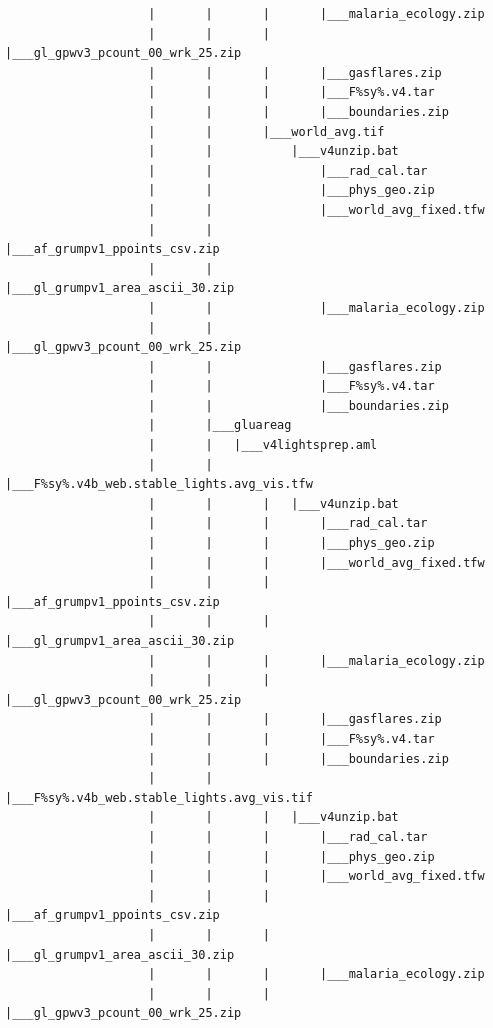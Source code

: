 \documentclass[]{book}
\begin{document}
\begin{verbatim}
                    |       |       |       |___malaria_ecology.zip
                    |       |       |       |___gl_gpwv3_pcount_00_wrk_25.zip
                    |       |       |       |___gasflares.zip
                    |       |       |       |___F%sy%.v4.tar
                    |       |       |       |___boundaries.zip
                    |       |       |___world_avg.tif
                    |       |           |___v4unzip.bat
                    |       |               |___rad_cal.tar
                    |       |               |___phys_geo.zip
                    |       |               |___world_avg_fixed.tfw
                    |       |               |___af_grumpv1_ppoints_csv.zip
                    |       |               |___gl_grumpv1_area_ascii_30.zip
                    |       |               |___malaria_ecology.zip
                    |       |               |___gl_gpwv3_pcount_00_wrk_25.zip
                    |       |               |___gasflares.zip
                    |       |               |___F%sy%.v4.tar
                    |       |               |___boundaries.zip
                    |       |___gluareag
                    |       |   |___v4lightsprep.aml
                    |       |       |___F%sy%.v4b_web.stable_lights.avg_vis.tfw
                    |       |       |   |___v4unzip.bat
                    |       |       |       |___rad_cal.tar
                    |       |       |       |___phys_geo.zip
                    |       |       |       |___world_avg_fixed.tfw
                    |       |       |       |___af_grumpv1_ppoints_csv.zip
                    |       |       |       |___gl_grumpv1_area_ascii_30.zip
                    |       |       |       |___malaria_ecology.zip
                    |       |       |       |___gl_gpwv3_pcount_00_wrk_25.zip
                    |       |       |       |___gasflares.zip
                    |       |       |       |___F%sy%.v4.tar
                    |       |       |       |___boundaries.zip
                    |       |       |___F%sy%.v4b_web.stable_lights.avg_vis.tif
                    |       |       |   |___v4unzip.bat
                    |       |       |       |___rad_cal.tar
                    |       |       |       |___phys_geo.zip
                    |       |       |       |___world_avg_fixed.tfw
                    |       |       |       |___af_grumpv1_ppoints_csv.zip
                    |       |       |       |___gl_grumpv1_area_ascii_30.zip
                    |       |       |       |___malaria_ecology.zip
                    |       |       |       |___gl_gpwv3_pcount_00_wrk_25.zip

\end{verbatim}
\end{document}
